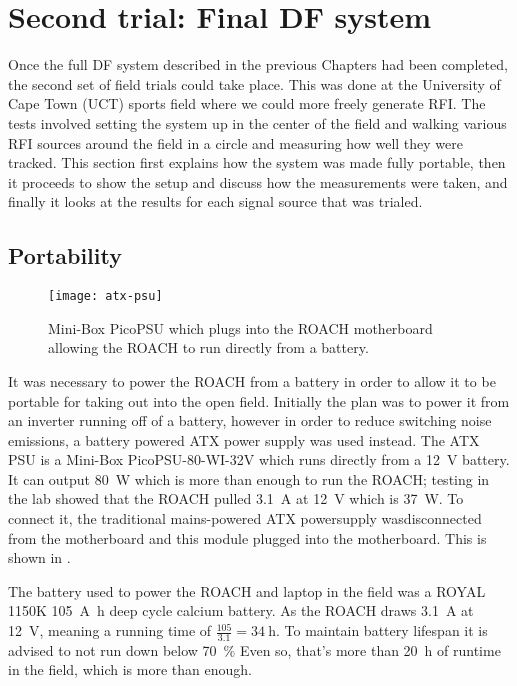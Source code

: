 \section{Second trial: Final DF system}
Once the full DF system described in the previous Chapters had been completed, the second set of field trials could take place. This was done at the University of Cape Town (UCT) sports field where we could more freely generate RFI. The tests involved setting the system up in the center of the field and walking various RFI sources around the field in a circle and measuring how well they were tracked. This section first explains how the system was made fully portable, then it proceeds to show the setup and discuss how the measurements were taken, and finally it looks at the results for each signal source that was trialed.

\subsection{Portability}
\begin{figure}
  \centering
  \texttt{[image: atx-psu]}
  \caption{Mini-Box PicoPSU which plugs into the ROACH motherboard allowing the ROACH to run directly from a battery.}
  \label{fig:field-trials:atx-psu}
\end{figure}
It was necessary to power the ROACH from a battery in order to allow it to be portable for taking out into the open field.
Initially the plan was to power it from an inverter running off of a battery, however in order to reduce switching noise emissions, a battery powered ATX power supply was used instead. The ATX PSU is a Mini-Box PicoPSU-80-WI-32V which runs directly from a \SI{12}{\volt} battery. 
It can output \SI{80}{\watt} which is more than enough to run the ROACH; testing in the lab showed that the ROACH pulled \SI{3.1}{\ampere} at \SI{12}{\volt} which is \SI{37}{\watt}.
To connect it, the traditional mains-powered ATX powersupply wasdisconnected from the motherboard and this module plugged into the motherboard. 
This is shown in .

The battery used to power the ROACH and laptop in the field was a ROYAL 1150K \SI{105}{\ampere\hour} deep cycle calcium battery.
As the ROACH draws \SI{3.1}{\ampere} at \SI{12}{\volt}, meaning a running time of \(\frac{105}{3.1} = \SI{34}{\hour}\).
To maintain battery lifespan it is advised to not run down below \SI{70}{\percent} Even so, that's more than \SI{20}{\hour} of runtime in the field, which is more than enough.


